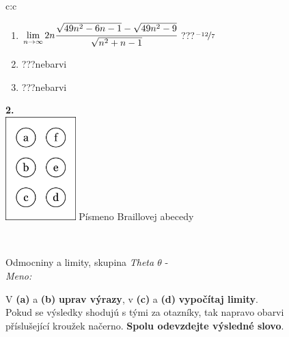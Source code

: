 \documentclass[10pt]{report}
\begin{document}
\begin{tabular}{c:c}
\begin{minipage}[c][104.5mm][t]{0.5\linewidth}
\begin{center}
\begin{minipage}{0.79\linewidth}
\begin{center}
\begin{varwidth}{\linewidth}
\begin{enumerate}
\item $\lim\limits_{n\to\infty}2n\cfrac{\sqrt{49n^2-6n-1}-\sqrt{49n^2-9}}{\sqrt{n^2+n-1}}$\quad \dotfill\; ???\;\dotfill \quad $\nicefrac{-12}{7}$
\item \quad \dotfill\; ???\;\dotfill \quad nebarvi
\item \quad \dotfill\; ???\;\dotfill \quad nebarvi
\end{enumerate}
\end{varwidth}
\end{center}
\end{minipage}
\begin{minipage}{0.20\linewidth}
\begin{center}
{\Huge\bfseries 2.} \\[2mm]
\includegraphics[height=40mm]{../images/braille.png}
{\small Písmeno Braillovej abecedy}
\end{center}
\end{minipage}
\end{center}
\end{minipage}
\\ \hdashline
\begin{minipage}[c][104.5mm][t]{0.5\linewidth}
\begin{center}
\vspace{7mm}
{\huge Odmocniny a limity, skupina \textit{Theta $\theta$} -}\\[5mm]
\textit{Meno:}\phantom{xxxxxxxxxxxxxxxxxxxxxxxxxxxxxxxxxxxxxxxxxxxxxxxxxxxxxxxxxxxxxxxxx}\\[5mm]
\begin{minipage}{0.95\linewidth}
\begin{center}
V \textbf{(a)} a \textbf{(b)} \textbf{uprav výrazy}, v \textbf{(c)} a \textbf{(d)} \textbf{vypočítaj limity}.\\Pokud se výsledky shodujú s tými za otazníky, tak napravo obarvi\\příslušející kroužek načerno. \textbf{Spolu odevzdejte výsledné slovo}.
\end{center}
\end{minipage}
\\[1mm]

\end{center}
\end{minipage}
\end{tabular}
\end{document}
